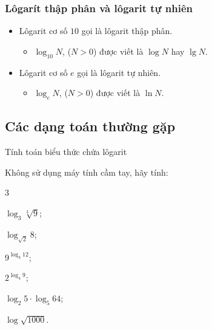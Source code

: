 \subsubsection{Lôgarít thập phân và lôgarit tự nhiên}
	\begin{itemize}
			\item [\iconMT]  Lôgarit cơ số $10$ gọi là lôgarit thập phân.
			\begin{itemize}
				\item [\faCheck] $\log_{10}N$, ($N>0$) được viết là $\log N$ hay $\lg N$.
			\end{itemize}
			\item [\iconMT]  Lôgarit cơ số $e$ gọi là lôgarit tự nhiên.
			\begin{itemize}
				\item [\faCheck] $\log_eN$, ($N>0$) được viết là $\ln N$.
			\end{itemize}
	\end{itemize}
\subsection{Các dạng toán thường gặp}

\begin{dang}{Tính toán biểu thức chứa lôgarit}
\end{dang}

\begin{vd}%
	Không sử dụng máy tính cầm tay, hãy tính:
	\begin{enumEX}[a)]{3}
		\item $\log_3 \sqrt[3]{9}$;
		\item $\log_{\sqrt{2}} 8$;
		\item $9^{\log_3 12}$;
		\item $2^{\log_4 9}$;
		\item $\log_2 5\cdot \log_5 64$;
		\item $ \log \sqrt{1000}$.
	\end{enumEX}
\end{vd} 

